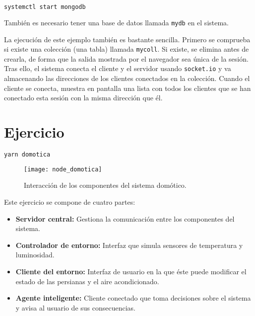 \begin{lstlisting}[language=sh]
systemctl start mongodb
\end{lstlisting}

También es necesario tener una base de datos llamada \texttt{mydb} en el sistema.

La ejecución de este ejemplo también es bastante sencilla.
Primero se comprueba si existe una colección (una tabla) llamada \texttt{mycoll}.
Si existe, se elimina antes de crearla, de forma que la salida mostrada por el navegador sea única de la sesión.
Tras ello, el sistema conecta el cliente y el servidor usando \texttt{socket.io} y va almacenando las direcciones de los clientes conectados en la colección.
Cuando el cliente se conecta, muestra en pantalla una lista con todos los clientes que se han conectado esta sesión con la misma dirección que él.

\section{Ejercicio}

\begin{lstlisting}[language=sh]
yarn domotica
\end{lstlisting}

\begin{figure}[!ht]
\begin{center}
	\texttt{[image: node\_domotica]}
\end{center}
\caption{Interacción de los componentes del sistema domótico.}
\end{figure}

Este ejercicio se compone de cuatro partes:

\begin{itemize}
	\item\textbf{Servidor central:}
		Gestiona la comunicación entre los componentes del sistema.
	\item\textbf{Controlador de entorno:}
		Interfaz que simula sensores de temperatura y luminosidad.
	\item\textbf{Cliente del entorno:}
		Interfaz de usuario en la que éste puede modificar el estado de las persianas y el aire acondicionado.
	\item\textbf{Agente inteligente:}
		Cliente conectado que toma decisiones sobre el sistema y avisa al usuario de sus consecuencias.
\end{itemize}

\pagebreak

